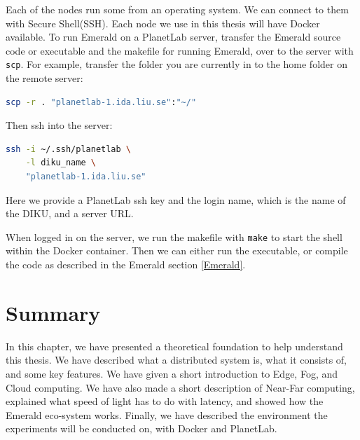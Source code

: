 Each of the nodes run some from an operating system. We can connect to them with Secure Shell(SSH). Each node we use in this thesis will have Docker available. To run Emerald on a PlanetLab server, transfer the Emerald source code or executable and the makefile for running Emerald, over to the server with \verb|scp|. For example, transfer the folder you are currently in to the home folder on the remote server:
\begin{lstlisting}[language=Bash]
scp -r . "planetlab-1.ida.liu.se":"~/"
\end{lstlisting}
Then ssh into the server: 
\begin{lstlisting}[language=Bash]
ssh -i ~/.ssh/planetlab \
    -l diku_name \
    "planetlab-1.ida.liu.se"
\end{lstlisting}
Here we provide a PlanetLab ssh key and the login name, which is the name of the DIKU, and a server URL.

When logged in on the server, we run the makefile with \verb|make| to start the shell within the Docker container. Then we can either run the executable, or compile the code as described in the Emerald section \ref{Emerald}.



\section{Summary}
In this chapter, we have presented a theoretical foundation to help understand this thesis. We have described what a distributed system is, what it consists of, and some key features. We have given a short introduction to Edge, Fog, and Cloud computing. We have also made a short description of Near-Far computing, explained what speed of light has to do with latency, and showed how the Emerald eco-system works. Finally, we have described the environment the experiments will be conducted on, with Docker and PlanetLab.

